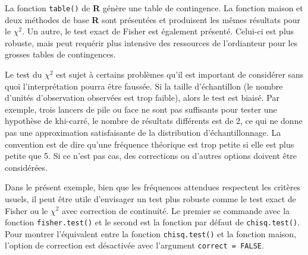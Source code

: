 \documentclass[
]{book}
\begin{document}
La fonction \texttt{table()} de \textbf{R} génère une table de contingence. La fonction maison et deux méthodes de base \textbf{R} sont présentées et produisent les mêmes résultats pour le \(\chi^2\). Un autre, le test exact de Fisher est également présenté. Celui-ci est plus robuste, mais peut requérir plus intensive des ressources de l'ordianteur pour les grosses tables de contingences.

Le test du \(\chi^2\) est sujet à certains problèmes qu'il est important de considérer sans quoi l'interprétation pourra être faussée. Si la taille d'échantillon (le nombre d'unités d'observation observées est trop faible), alors le test est biaisé. Par exemple, trois lancers de pile ou face ne sont pas suffisants pour tester une hypothèse de khi-carré, le nombre de résultats différents est de 2, ce qui ne donne pas une approximation satisfaisante de la distribution d'échantillonnage. La convention est de dire qu'une fréquence théorique est trop petite si elle est plus petite que 5. Si ce n'est pas cas, des corrections ou d'autres options doivent être considérées.

Dans le présent exemple, bien que les fréquences attendues respectent les critères usuels, il peut être utile d'envisager un test plus robuste comme le test exact de Fisher ou le \(\chi^2\) avec correction de continuité. Le premier se commande avec la fonction \texttt{fisher.test()} et le second est la fonction par défaut de \texttt{chisq.test()}. Pour montrer l'équivalent entre la fonction \texttt{chisq.test()} et la fonction maison, l'option de correction est désactivée avec l'argument \texttt{correct\ =\ FALSE}.
\end{document}
